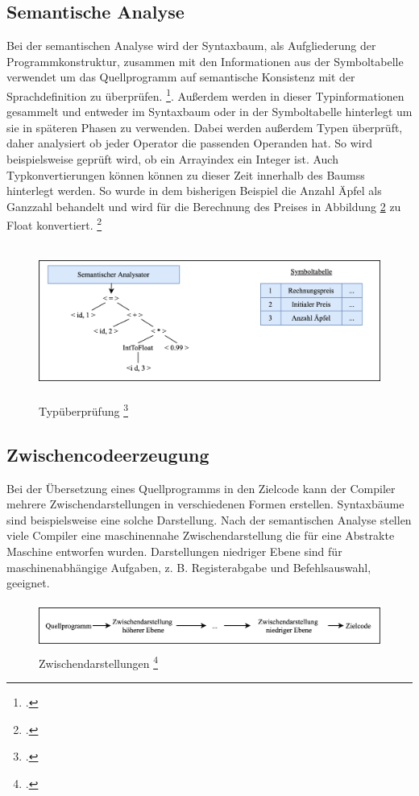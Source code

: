 \subsection{Semantische Analyse}

Bei der semantischen Analyse wird der Syntaxbaum,    als Aufgliederung der Programmkonstruktur,  zusammen mit den Informationen aus der Symboltabelle verwendet um das Quellprogramm auf semantische Konsistenz mit der Sprachdefinition zu überprüfen. \footcite[Vgl.][S. 157]{Wilhelm2012}.  Außerdem werden in dieser Typinformationen gesammelt und entweder im Syntaxbaum oder in der Symboltabelle hinterlegt um sie in späteren Phasen zu verwenden. Dabei werden außerdem Typen überprüft,  daher analysiert ob jeder Operator die passenden Operanden hat.  So wird beispielsweise geprüft wird, ob ein Arrayindex ein Integer ist. Auch Typkonvertierungen können können zu dieser Zeit innerhalb des Baumss hinterlegt werden.  So wurde in dem bisherigen Beispiel die Anzahl Äpfel als Ganzzahl behandelt und wird für die Berechnung des Preises in Abbildung \ref{fig:Typ} zu Float konvertiert. \footcite[Vgl.][S. 9ff]{Ullmann2008}

\begin{figure}[!ht]
 \includegraphics[width=14.5cm,height=5cm]{Images/Compiler/Type.png}
 \caption[Typüberprüfung]{Typüberprüfung \protect\footcite{Ullmann2008} }
 \label{fig:Typ}
\end{figure}
\subsection{Zwischencodeerzeugung}
Bei der Übersetzung eines Quellprogramms in den Zielcode kann der Compiler mehrere Zwischendarstellungen in verschiedenen Formen erstellen. Syntaxbäume sind beispielsweise eine solche Darstellung. Nach der semantischen Analyse stellen viele Compiler eine maschinennahe Zwischendarstellung die für eine Abstrakte Maschine entworfen wurden.  Darstellungen niedriger Ebene sind für maschinenabhängige Aufgaben, z. B. Registerabgabe und Befehlsauswahl, geeignet.
\begin{figure}[!ht]
 \includegraphics[width=14.5cm,height=1.52cm]{Images/Compiler/Zwischendarstellungen.png}
 \caption[Zwischendarstellungen]{Zwischendarstellungen \protect\footcite{Ullmann2008} }
 \label{fig:Typ}
\end{figure}

